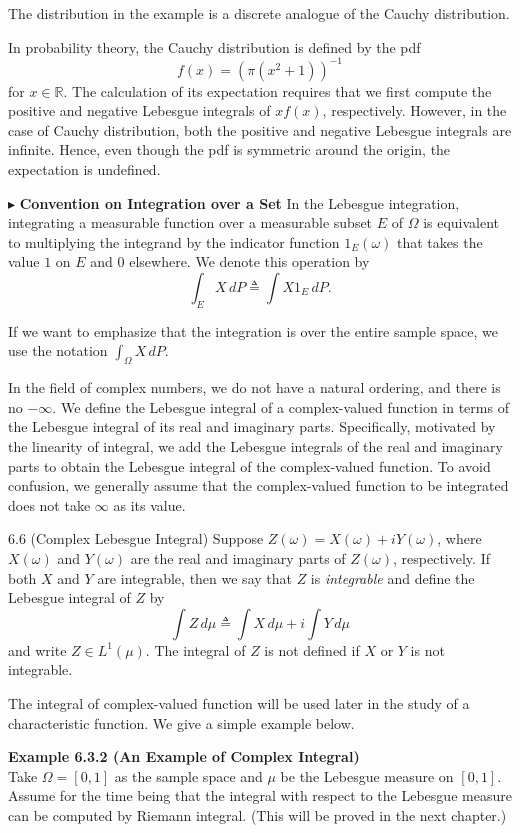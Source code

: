 The distribution in the example is a discrete analogue of the Cauchy distribution.

In probability theory, the Cauchy distribution is defined by the pdf
\[
f(x)=(\pi(x^2+1))^{-1}
\]
for $x \in \mathbb{R}$. The calculation of its expectation requires that we first compute the positive and negative Lebesgue integrals of $xf(x)$, respectively. However, in the case of Cauchy distribution, both the positive and negative Lebesgue integrals are infinite. Hence, even though the pdf is symmetric around the origin, the expectation is undefined.

\noindent$\blacktriangleright$ \textbf{Convention on Integration over a Set} In the Lebesgue integration, integrating a measurable function over a measurable subset $E$ of $\Omega$ is equivalent to multiplying the integrand by the indicator function $1_E(\omega)$ that takes the value $1$ on $E$ and $0$ elsewhere. We denote this operation by
\[
\int_E X\, dP \triangleq \int X1_E\, dP.
\]

If we want to emphasize that the integration is over the entire sample space, we use the notation $\int_{\Omega} X\, dP$.

In the field of complex numbers, we do not have a natural ordering, and there is no $-\infty$. We define the Lebesgue integral of a complex-valued function in terms of the Lebesgue integral of its real and imaginary parts. Specifically, motivated by the linearity of integral, we add the Lebesgue integrals of the real and imaginary parts to obtain the Lebesgue integral of the complex-valued function. To avoid confusion, we generally assume that the complex-valued function to be integrated does not take $\infty$ as its value.

\begin{defbox}{6.6 (Complex Lebesgue Integral)}
Suppose $Z(\omega)=X(\omega)+iY(\omega)$, where $X(\omega)$ and $Y(\omega)$ are the real and imaginary parts of $Z(\omega)$, respectively. If both $X$ and $Y$ are integrable, then we say that $Z$ is \textit{integrable} and define the Lebesgue integral of $Z$ by
\[
\int Z\, d\mu \triangleq \int X\, d\mu + i\int Y\, d\mu
\]
and write $Z \in L^1(\mu)$. The integral of $Z$ is not defined if $X$ or $Y$ is not integrable.
\end{defbox}

The integral of complex-valued function will be used later in the study of a characteristic function. We give a simple example below.

\textbf{Example 6.3.2 (An Example of Complex Integral)} \\
Take $\Omega=[0,1]$ as the sample space and $\mu$ be the Lebesgue measure on $[0,1]$. Assume for the time being that the integral with respect to the Lebesgue measure can be computed by Riemann integral. (This will be proved in the next chapter.)

